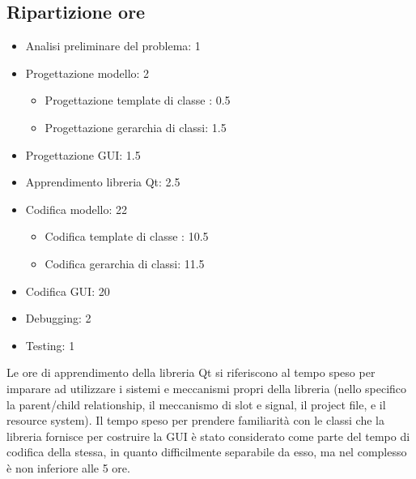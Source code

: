 \subsection{Ripartizione ore} %
\label{sub:ripartizione_ore}
\begin{itemize}
	\item Analisi preliminare del problema: 1
	\item Progettazione modello: 2
	\begin{itemize}
		\item Progettazione template di classe : 0.5
		\item Progettazione gerarchia di classi: 1.5
	\end{itemize}
	\item Progettazione GUI: 1.5
	\item Apprendimento libreria Qt: 2.5
	\item Codifica modello: 22
	\begin{itemize}
		\item Codifica template di classe : 10.5
		\item Codifica gerarchia di classi: 11.5
	\end{itemize}
	\item Codifica GUI: 20
	\item Debugging: 2
	\item Testing: 1
\end{itemize}
\begin{nota}
	Le ore di apprendimento della libreria Qt si riferiscono al tempo speso per imparare ad utilizzare i sistemi e meccanismi propri della libreria (nello specifico la parent/child relationship, il meccanismo di slot e signal, il project file, e il resource system). Il tempo speso per prendere familiarità con le classi che la libreria fornisce per costruire la GUI è stato considerato come parte del tempo di codifica della stessa, in quanto difficilmente separabile da esso, ma nel complesso è non inferiore alle 5 ore.
\end{nota}
